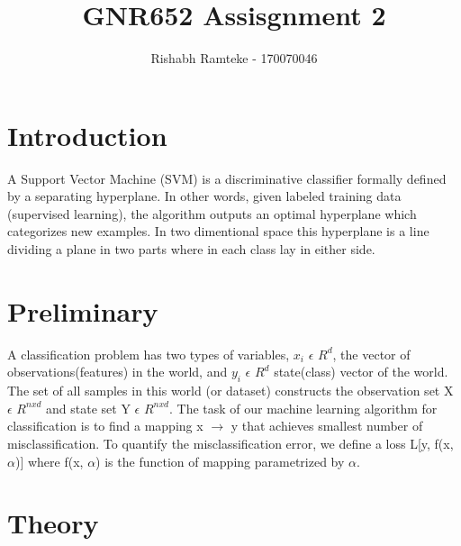 \documentclass[12pt]{article}
\title{GNR652 Assisgnment 2 \\}
\author{Rishabh Ramteke - 170070046 }
\begin{document}
\maketitle
\section{Introduction}
A Support Vector Machine (SVM) is a discriminative classifier formally defined by a separating hyperplane. In other words, given labeled training data (supervised learning), the algorithm outputs an optimal hyperplane which categorizes new examples. In two dimentional space this hyperplane is a line dividing a plane in two parts where in each class lay in either side.

\section{Preliminary}
A classification problem has two types of variables, $x_i$ $\epsilon$ $R^d$, the vector of observations(features) in the
world, and $y_i$ $\epsilon$ $R^d$
state(class) vector of the world. The set of all samples in this world (or dataset) constructs the observation set X $\epsilon$ $R^{nxd}$ and state set Y $\epsilon$ $R^{nxd}$. The task of our machine learning algorithm for classification is to find a mapping x $\rightarrow$ y that achieves smallest number of misclassification. To
quantify the misclassification error, we define a loss L[y, f(x, $\alpha$)] where f(x, $\alpha$) is the function of mapping
parametrized by $\alpha$.

\section{Theory}
\end{document}
